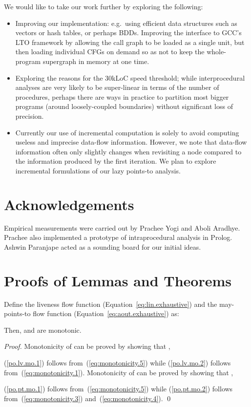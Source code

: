 \documentclass{llncs}
\begin{document}
We would like to take our work further by exploring the following:
\begin{itemize}
\item Improving our implementation: e.g.\ using
efficient data structures such as vectors or hash tables,
or perhaps BDDs.
Improving the interface to GCC's LTO framework by allowing the call graph
to be loaded as a single unit, but then loading
individual CFGs on demand so as not to keep the whole-program
supergraph in memory at one time.
\item Exploring the reasons for the 30kLoC speed threshold;
while interprocedural analyses are very likely to be super-linear
in terms of the number of procedures, perhaps there are ways in practice to
partition most bigger programs (around loosely-coupled boundaries)
without significant loss of precision.
\item Currently our use of incremental computation is solely to avoid
computing useless and imprecise data-flow information.  However, we note
that data-flow information often only slightly changes when revisiting a node
compared to the information produced by the first iteration.
We plan to explore incremental formulations of our lazy points-to analysis.
\end{itemize}


\section*{Acknowledgements}
Empirical measurements were carried out by Prachee Yogi and Aboli Aradhye. Prachee also implemented a prototype of intraprocedural
analysis in Prolog.  Ashwin Paranjape acted as a sounding board for our initial ideas.



\appendix
\setcounter{lemma}{0}
\setcounter{theorem}{0}
\setcounter{corollary}{0}

\section{Proofs of Lemmas and Theorems}
\label{app:proofs}

\begin{theorem}
Define the liveness flow function \text{} (Equation~\ref{eq:lin.exhaustive}) and the may-points-to
flow function \text{}
(Equation~\ref{eq:aout.exhaustive}) as:

Then,  and  are monotonic.
\end{theorem}
\begin{proof}
Monotonicity of   can be proved by showing that 
\text{},

(\ref{po.lv.mo.1}) follows from~(\ref{eq:monotonicity.5}) while
(\ref{po.lv.mo.2}) follows from~(\ref{eq:monotonicity.1}).
Monotonicity of   can be proved by showing that 
\text{},

(\ref{po.pt.mo.1}) follows from~(\ref{eq:monotonicity.5}) while
(\ref{po.pt.mo.2}) follows from~(\ref{eq:monotonicity.3}) and~(\ref{eq:monotonicity.4}). \qed
\end{proof}
\end{document}
